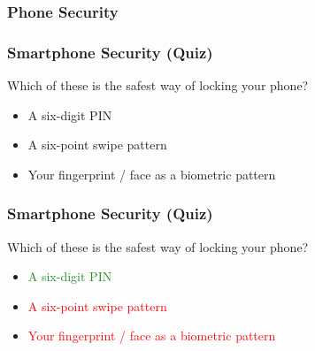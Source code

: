 \documentclass[aspectratio=1610,dvipsnames]{beamer}
\begin{document}
\subsubsection{Phone Security}


\begin{frame}
\frametitle{Smartphone Security (Quiz)}

Which of these is the safest way of locking your phone?
\medskip

\begin{itemize}
\item A six-digit PIN
\item A six-point swipe pattern
\item Your fingerprint / face as a biometric pattern
\end{itemize}

\end{frame}

\begin{frame}
\frametitle{Smartphone Security (Quiz)}

Which of these is the safest way of locking your phone?
\medskip

\begin{itemize}
\item \textcolor{ForestGreen}{A six-digit PIN}
\item \textcolor{Red}{A six-point swipe pattern}
\item \textcolor{Red}{Your fingerprint / face as a biometric pattern}
\end{itemize}

\end{frame}

\end{document}
